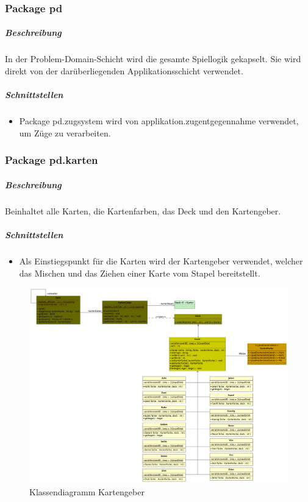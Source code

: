 \documentclass[12pt,halfparskip]{scrartcl}
\begin{document}
\clearpage

\subsubsection{Package pd} %
\label{ssub:package_pd}
\subparagraph{Beschreibung}
In der Problem-Domain-Schicht wird die gesamte Spiellogik gekapselt. Sie wird direkt von der darüberliegenden Applikationsschicht verwendet.

\subparagraph{Schnittstellen} %
\label{ssub:schnittstellen}
\begin{itemize}
	\item Package pd.zugsystem wird von applikation.zugentgegennahme verwendet, um Züge zu verarbeiten.
\end{itemize}

\subsubsection{Package pd.karten} %
\label{ssub:package_pd_karten}
\subparagraph{Beschreibung}
Beinhaltet alle Karten, die Kartenfarben, das Deck und den Kartengeber. 

\subparagraph{Schnittstellen} %
\label{ssub:schnittstellen}
\begin{itemize}
	\item Als Einstiegspunkt für die Karten wird der Kartengeber verwendet, welcher das Mischen und das Ziehen einer Karte vom Stapel bereitstellt.
\end{itemize}

\begin{figure}[h]
	\centering
	\includegraphics[width=0.8 \textwidth]{pd_kartengeber}
	\caption{Klassendiagramm Kartengeber}
	\label{fig:pd_kartengeber}
\end{figure}
\end{document}
